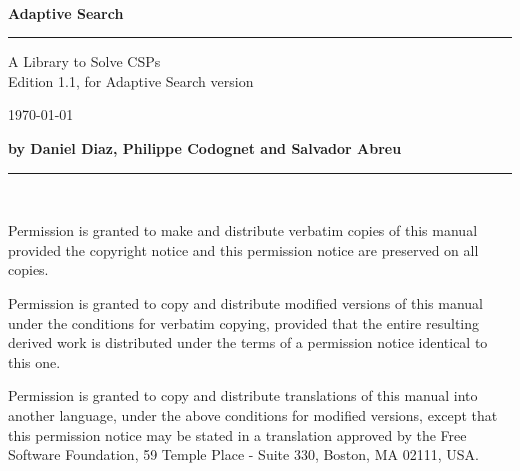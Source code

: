 \newlength{\saveparskip}
\setlength{\saveparskip}{\parskip}

\pagestyle{empty}
\setlength{\parskip}{0pt}
~

\vspace{4cm}
{\huge\bf Adaptive Search}

\vspace{3mm}

\rule[2mm]{\linewidth}{2mm}

\begin{flushright}

{\Large
A Library to Solve CSPs\\
Edition 1.1, for Adaptive Search version 

\today
}

\end{flushright}


\vspace{10cm}

{\large\bf by Daniel Diaz, Philippe Codognet and Salvador Abreu}

\rule[2mm]{\linewidth}{1mm}

\newpage
~

\vspace{10cm}

\setlength{\parskip}{\saveparskip}



Permission is granted to make and distribute verbatim copies of this manual
provided the copyright notice and this permission notice are preserved on all
copies.

Permission is granted to copy and distribute modified versions of this manual
under the conditions for verbatim copying, provided that the entire resulting
derived work is distributed under the terms of a permission notice identical
to this one.

Permission is granted to copy and distribute translations of this manual into
another language, under the above conditions for modified versions, except
that this permission notice may be stated in a translation approved by the
Free Software Foundation, 59 Temple Place - Suite 330, Boston, MA 02111, USA.


\newpage
\pagestyle{fancy}

\setcounter{page}{1}


